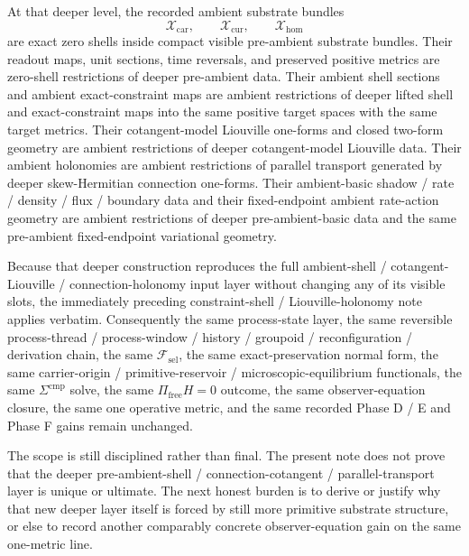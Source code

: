 \documentclass[11pt]{article}
\newcommand{\StemFunctional}{\mathscr F_{\mathrm{sel}}}
\newcommand{\TensorAmbientSpace}{\mathcal X_{\mathrm{car}}}
\newcommand{\CurAmbientSpace}{\mathcal X_{\mathrm{cur}}}
\newcommand{\HomAmbientSpace}{\mathcal X_{\mathrm{hom}}}
\begin{document}
At that deeper level, the recorded ambient substrate bundles
\[
\TensorAmbientSpace,\qquad
\CurAmbientSpace,\qquad
\HomAmbientSpace
\]
are exact zero shells inside compact visible pre-ambient substrate bundles. Their readout maps, unit sections, time reversals, and preserved positive metrics are zero-shell restrictions of deeper pre-ambient data. Their ambient shell sections and ambient exact-constraint maps are ambient restrictions of deeper lifted shell and exact-constraint maps into the same positive target spaces with the same target metrics. Their cotangent-model Liouville one-forms and closed two-form geometry are ambient restrictions of deeper cotangent-model Liouville data. Their ambient holonomies are ambient restrictions of parallel transport generated by deeper skew-Hermitian connection one-forms. Their ambient-basic shadow / rate / density / flux / boundary data and their fixed-endpoint ambient rate-action geometry are ambient restrictions of deeper pre-ambient-basic data and the same pre-ambient fixed-endpoint variational geometry.

Because that deeper construction reproduces the full ambient-shell / cotangent-Liouville / connection-holonomy input layer without changing any of its visible slots, the immediately preceding constraint-shell / Liouville-holonomy note applies verbatim. Consequently the same process-state layer, the same reversible process-thread / process-window / history / groupoid / reconfiguration / derivation chain, the same \(\StemFunctional\), the same exact-preservation normal form, the same carrier-origin / primitive-reservoir / microscopic-equilibrium functionals, the same \(\Sigma^{\mathrm{cmp}}\) solve, the same \(\Pi_{\mathrm{free}}H=0\) outcome, the same observer-equation closure, the same one operative metric, and the same recorded Phase D / E and Phase F gains remain unchanged.

The scope is still disciplined rather than final. The present note does not prove that the deeper pre-ambient-shell / connection-cotangent / parallel-transport layer is unique or ultimate. The next honest burden is to derive or justify why that new deeper layer itself is forced by still more primitive substrate structure, or else to record another comparably concrete observer-equation gain on the same one-metric line.
\end{document}
